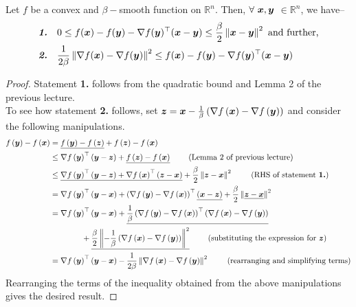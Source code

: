 \documentclass{article}
\begin{document}
\begin{lemma}
\label{improvedBoundsForConvexAndSmoothFunctions}
Let $f$ be a convex and $\beta-$smooth function on $\mathbb{R}^n$. 
Then, $\forall\,\vx,\vy$ $\in \mathbb{R}^n$,  we have--
\begin{align}
    \text{\emph{\textbf{1.}}}\quad & 
    0 \leq f({\bm{x}})-f({\bm{y}}) - \nabla f({\bm{y}})^\top({\bm{x}}-{\bm{y}}) \leq \dfrac{\beta}{2} \left\|{\bm{x}}-{\bm{y}}\right\|^2\ \text{and further,}
    \nonumber\\
    \text{\emph{\textbf{2.}}}\quad &
    \frac{1}{2 \beta} \left\|\nabla f({\bm{x}})-\nabla f({\bm{y}})\right\|^2
    \leq
	f({\bm{x}}) - f({\bm{y}}) - \nabla f({\bm{y}})^\top ({\bm{x}}-{\bm{y}})
	\nonumber
\end{align}

\end{lemma}
\begin{proof}
Statement \textbf{1.} follows from the quadratic bound and Lemma 2 of the previous lecture.\\[5pt]
To see how statement \textbf{2.} follows, set 
$
    {\bm{z}} 
    = {\bm{x}} - \frac{1}{\beta}\left(
        \nabla f\left({\bm{x}}\right) - \nabla f\left({\bm{y}}\right)
    \right)
$ and consider the following manipulations.
\begin{align*}
	f\left(\vy\right) - f\left(\vx\right)
	&=
	\underline{f\left(\vy\right) - f\left(\vz\right)}
	+
	f\left(\vz\right) - f\left(\vx\right)
	\nonumber\\
	&
	\leq 
	\nabla f\left(\vy\right)^\top\left(\vy - \vz\right)
	+
	\underline{
	    f\left(\vz\right) - f\left(\vx\right)
	 }\ 
	\tag{Lemma 2 of previous lecture}
	\nonumber\\
	&
	\leq 
	\underline{
	\nabla f\left(\vy\right)^\top\left(\vy - \vz\right)
	+
	\nabla f\left(\vx\right)^\top \left(\vz - \vx\right)
	}
	+ 
	\frac{\beta}{2}\left\lVert\vz - \vx\right\rVert^2
	\ 
	\tag{RHS of statement \textbf{1.}}
	\nonumber\\
	&
	=
	\nabla f\left(\vy\right)^\top\left(\vy - \vx\right)
	+
	\left(
	    \nabla f\left(\vy\right)
	    -
	    \nabla f\left(\vx\right)
	\right)^\top
	\underline{
	\left(\vx - \vz\right)
	}
	+ 
	\frac{\beta}{2}
	\left\lVert
	\underline{
	\vz - \vx
	}
	\right\rVert^2
	\nonumber\\
	&
	=
	\nabla f\left(\vy\right)^\top\left(\vy - \vx\right)
	+
	\underline{
	\frac{1}{\beta}
	\left(
	    \nabla f\left(\vy\right)
	    -
	    \nabla f\left(\vx\right)
	\right)^\top
	\left(
	    \nabla f\left(\vx\right) - \nabla f\left(\vy\right)
	\right)
	}
	\nonumber\\
	&
	\qquad\qquad
	+
	\underline{
	\frac{\beta}{2}
	\left\lVert
	-\frac{1}{\beta}\left(
	    \nabla f\left(\vx\right) - \nabla f\left(\vy\right)
	\right)
	\right\rVert^2
	}\ 
	\tag{substituting the expression for $\vz$}
	\nonumber\\
	&
	=
	\nabla f\left(\vy\right)^\top\left(\vy - \vx\right)
	-
	\frac{1}{2\beta}
	\left\lVert
	    \nabla f\left(\vx\right) - \nabla f\left(\vy\right)
	\right\rVert^2\ 
	\tag{rearranging and simplifying terms}
\end{align*}{}
Rearranging the terms of the inequality obtained from the above manipulations gives the desired result.
\end{proof}
\end{document}
